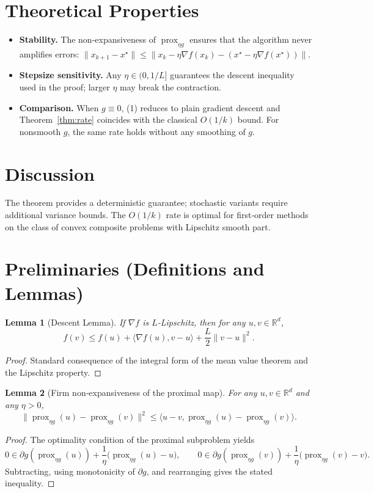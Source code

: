 \documentclass{article}
\newtheorem{lemma}{Lemma}
\newcommand{\prox}{\operatorname{prox}}
\newcommand{\R}{\mathbb{R}}
\begin{document}
\section*{Theoretical Properties}
\begin{itemize}
    \item \textbf{Stability.} The non‑expansiveness of $\prox_{\eta g}$ ensures that the algorithm never amplifies errors: 
    $\|x_{k+1}-x^{\star}\|\le\|x_{k}-\eta\nabla f(x_{k})- (x^{\star}-\eta\nabla f(x^{\star}))\|$.
    \item \textbf{Stepsize sensitivity.} Any $\eta\in(0,1/L]$ guarantees the descent inequality used in the proof; larger $\eta$ may break the contraction.
    \item \textbf{Comparison.} When $g\equiv0$, (1) reduces to plain gradient descent and Theorem~\ref{thm:rate} coincides with the classical $O(1/k)$ bound. For nonsmooth $g$, the same rate holds without any smoothing of $g$.
\end{itemize}

\section*{Discussion}
The theorem provides a deterministic guarantee; stochastic variants require additional variance bounds. The $O(1/k)$ rate is optimal for first‑order methods on the class of convex composite problems with Lipschitz smooth part.

\newpage

\section*{Preliminaries (Definitions and Lemmas)}

\begin{lemma}[Descent Lemma]\label{lem:descent}
If $\nabla f$ is $L$‑Lipschitz, then for any $u,v\in\R^{d}$,
\[
f(v)\le f(u)+\langle \nabla f(u),v-u\rangle+\frac{L}{2}\|v-u\|^{2}.
\]
\end{lemma}
\begin{proof}
Standard consequence of the integral form of the mean value theorem and the Lipschitz property.
\end{proof}

\begin{lemma}[Firm non‑expansiveness of the proximal map]\label{lem:prox}
For any $u,v\in\R^{d}$ and any $\eta>0$,
\[
\|\prox_{\eta g}(u)-\prox_{\eta g}(v)\|^{2}
\le \langle u-v,\prox_{\eta g}(u)-\prox_{\eta g}(v)\rangle .
\]
\end{lemma}
\begin{proof}
The optimality condition of the proximal subproblem yields
\[
0\in\partial g(\prox_{\eta g}(u))+\frac{1}{\eta}\bigl(\prox_{\eta g}(u)-u\bigr), 
\qquad
0\in\partial g(\prox_{\eta g}(v))+\frac{1}{\eta}\bigl(\prox_{\eta g}(v)-v\bigr).
\]
Subtracting, using monotonicity of $\partial g$, and rearranging gives the stated inequality.
\end{proof}
\end{document}
